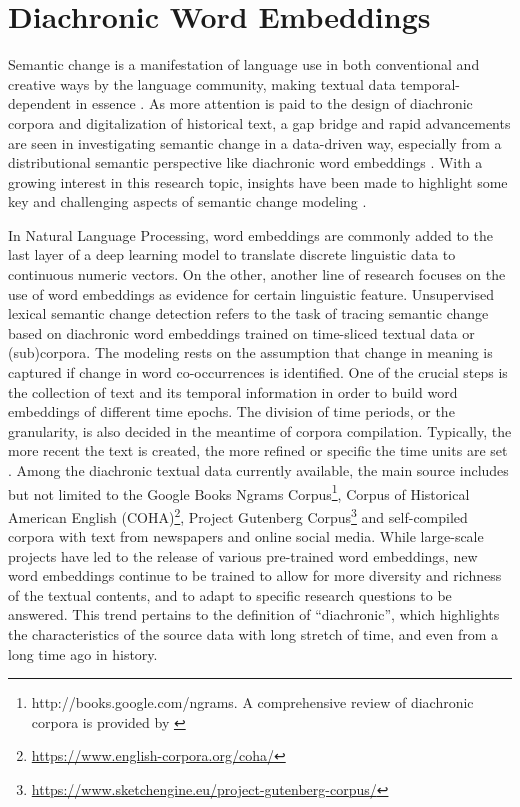 \section{Diachronic Word Embeddings}
Semantic change is a manifestation of language use in both conventional and creative ways by the language community, making textual data temporal-dependent in essence \parencite{kutuzov2018survey}. As more attention is paid to the design of diachronic corpora and digitalization of historical text, a gap bridge and rapid advancements are seen in investigating semantic change in a data-driven way, especially from a distributional semantic perspective like diachronic word embeddings \parencite{kutuzov2018survey, tahmasebi2018survey, hamilton2016law}. With a growing interest in this research topic, insights have been made to highlight some key and challenging aspects of semantic change modeling \parencite{kutuzov2018survey,tahmasebi2018survey,camacho2018survey}. 

In Natural Language Processing, word embeddings are commonly added to the last layer of a deep learning model to translate discrete linguistic data to continuous numeric vectors. On the other, another line of research focuses on the use of word embeddings as evidence for certain linguistic feature. \parencite{antoniak2018evaluating} Unsupervised lexical semantic change detection refers to the task of tracing semantic change based on diachronic word embeddings trained on time-sliced textual data or (sub)corpora. The modeling rests on the assumption that change in meaning is captured if change in word co-occurrences is identified. One of the crucial steps is the collection of text and its temporal information in order to build word embeddings of different time epochs. The division of time periods, or the granularity, is also decided in the meantime of corpora compilation. Typically, the more recent the text is created, the more refined or specific the time units are set \parencite{kutuzov2018survey}. Among the diachronic textual data currently available, the main source includes but not limited to the Google Books Ngrams Corpus\footnote{http://books.google.com/ngrams. A comprehensive review of diachronic corpora is provided by \textcite[38--41]{tahmasebi2018survey}}, Corpus of Historical American English (COHA)\footnote{\url{https://www.english-corpora.org/coha/}}, Project Gutenberg Corpus\footnote{\url{https://www.sketchengine.eu/project-gutenberg-corpus/}} and self-compiled corpora with text from newspapers and online social media. While large-scale projects have led to the release of various pre-trained word embeddings, new word embeddings continue to be trained to allow for more diversity and richness of the textual contents, and to adapt to specific research questions to be answered. This trend pertains to the definition of ``diachronic'', which highlights the characteristics of the source data with long stretch of time, and even from a long time ago in history.

